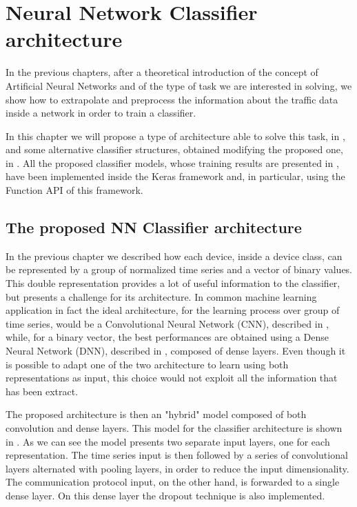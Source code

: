 \chapter{Neural Network Classifier architecture}\label{chap5}

In the previous chapters, after a theoretical introduction of the concept of Artificial Neural Networks and of the type of task we are interested in solving, we show how to extrapolate and preprocess the information about the traffic data inside a network in order to train a classifier.

In this chapter we will propose a type of architecture able to solve this task, in , and some  alternative classifier structures, obtained modifying the proposed one, in . All the proposed classifier models, whose training results are presented in , have been implemented inside the Keras framework and, in particular, using the Function API of this framework. 




\section{The proposed NN Classifier architecture}\label{modelprop}

In the previous chapter we described how each device, inside a device class, can be represented by a group of normalized time series and a vector of binary values. This double representation provides a lot of useful information to the classifier, but presents a challenge for its architecture. In common machine learning application in fact the ideal architecture, for the learning process over group of time series, would be a Convolutional Neural Network (CNN), described in , while, for a binary vector, the best performances are obtained using a Dense Neural Network (DNN), described in , composed of dense layers.
Even though it is possible to adapt one of the two architecture to learn using both representations as input, this choice would not exploit all the information that has been extract. 

The proposed architecture is then an "hybrid" model composed of both convolution and dense layers.
This model for the classifier architecture is shown in . As we can see the model presents two separate input layers, one for each representation. The time series input is then followed by a series of convolutional layers alternated with pooling layers, in order to reduce the input dimensionality. The communication protocol input, on the other hand, is forwarded to a single dense layer. On this dense layer the dropout technique is also implemented.

